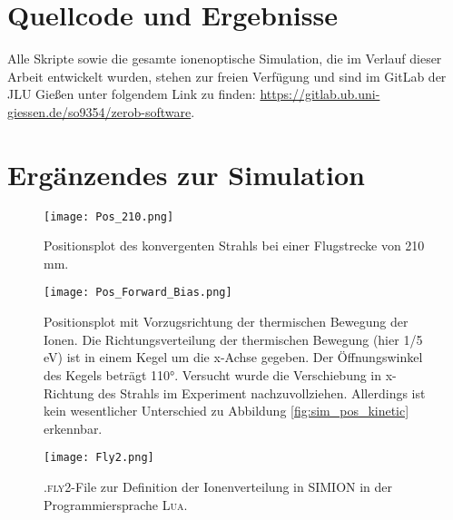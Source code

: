 \clearpage
\section{Quellcode und Ergebnisse}
Alle Skripte sowie die gesamte ionenoptische Simulation, die im Verlauf dieser Arbeit entwickelt wurden, stehen zur freien Verfügung und sind im GitLab der JLU Gießen unter folgendem Link zu finden: \url{https://gitlab.ub.uni-giessen.de/so9354/zerob-software}.
\section{Ergänzendes zur Simulation}
\begin{figure}[H]
    \centering
    \texttt{[image: Pos\_210.png]}
    \caption[Positionsplot des konvergenten Strahls]{Positionsplot des konvergenten Strahls bei einer Flugstrecke von 210 mm.}
    \label{fig:pos_210}
\end{figure}

\begin{figure}[H]
    \centering
    \texttt{[image: Pos\_Forward\_Bias.png]}
    \caption[Positionsplot mit Vorzugsrichtung der thermischen Bewegung]{Positionsplot mit Vorzugsrichtung der thermischen Bewegung der Ionen. Die Richtungsverteilung der thermischen Bewegung (hier 1/5 eV) ist in einem Kegel um die x-Achse gegeben. Der Öffnungswinkel des Kegels beträgt 110°. Versucht wurde die Verschiebung in x-Richtung des Strahls im Experiment nachzuvollziehen. Allerdings ist kein wesentlicher Unterschied zu Abbildung \ref{fig:sim_pos_kinetic} erkennbar.}
    \label{fig:pos_bias}
\end{figure}   


\begin{figure}[H]
    \centering
    \texttt{[image: Fly2.png]}
    \caption[Ionenverteilung .fly2-File]{\textsc{.fly2}-File zur Definition der Ionenverteilung in \textsc{SIMION} in der Programmiersprache \textsc{Lua}.}
    \label{fly2}
\end{figure}